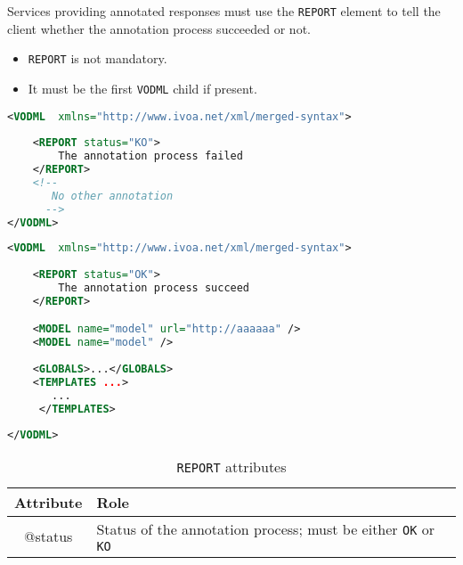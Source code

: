 Services providing annotated responses must use the \texttt{REPORT}  element to tell the client whether the annotation process succeeded or not.

\begin{itemize}
\item \texttt{REPORT} is not mandatory.
\item It must be the first \texttt{VODML} child if present.
\end{itemize}



\begin{lstlisting}[caption={\texttt{REPORT} example for an annotation failure},language=XML]
<VODML	xmlns="http://www.ivoa.net/xml/merged-syntax">
	
	<REPORT status="KO">
	    The annotation process failed
	</REPORT>
	<!-- 
	   No other annotation
	  -->	
</VODML>
\end{lstlisting}

\begin{lstlisting}[caption={\texttt{REPORT} example for an valid annotation},language=XML]
<VODML	xmlns="http://www.ivoa.net/xml/merged-syntax">
	
	<REPORT status="OK">
	    The annotation process succeed
	</REPORT>

	<MODEL name="model" url="http://aaaaaa" />
	<MODEL name="model" />
	
	<GLOBALS>...</GLOBALS>
	<TEMPLATES ...>
	   ...
	 </TEMPLATES>
	
</VODML>
\end{lstlisting}


\begin{table}[!htbp]
  \small
  \centering
  \begin{tabulary}{\linewidth}{|c|J|}       
    \hline 
         \textbf{Attribute} & 
         \textbf {Role}\\
    \hline
    \hline  
         @status  & 
        Status of the annotation process; must be either \texttt{OK} or \texttt{KO} \\
    \hline 
  \end{tabulary}
  \caption{\texttt{REPORT} attributes} 
  \label{tbl:report-att}
\end{table}

